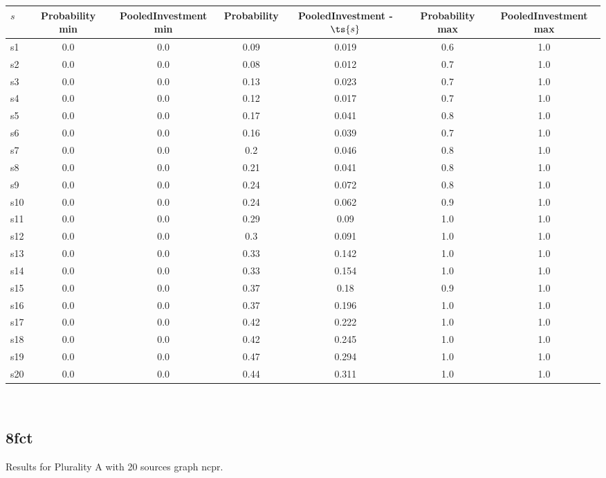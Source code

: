 \documentclass{article}
\begin{document}
\noindent\begin{tabular}{|l|c|c|c|c|c|c|}
\hline
$s$& Probability min & PooledInvestment min & Probability & PooledInvestment - $\ts{s}$ & Probability max & PooledInvestment max\\
\hline
s1 &0.0 & 0.0 & 0.09 & 0.019 & 0.6 & 1.0\\
\hline
s2 &0.0 & 0.0 & 0.08 & 0.012 & 0.7 & 1.0\\
\hline
s3 &0.0 & 0.0 & 0.13 & 0.023 & 0.7 & 1.0\\
\hline
s4 &0.0 & 0.0 & 0.12 & 0.017 & 0.7 & 1.0\\
\hline
s5 &0.0 & 0.0 & 0.17 & 0.041 & 0.8 & 1.0\\
\hline
s6 &0.0 & 0.0 & 0.16 & 0.039 & 0.7 & 1.0\\
\hline
s7 &0.0 & 0.0 & 0.2 & 0.046 & 0.8 & 1.0\\
\hline
s8 &0.0 & 0.0 & 0.21 & 0.041 & 0.8 & 1.0\\
\hline
s9 &0.0 & 0.0 & 0.24 & 0.072 & 0.8 & 1.0\\
\hline
s10 &0.0 & 0.0 & 0.24 & 0.062 & 0.9 & 1.0\\
\hline
s11 &0.0 & 0.0 & 0.29 & 0.09 & 1.0 & 1.0\\
\hline
s12 &0.0 & 0.0 & 0.3 & 0.091 & 1.0 & 1.0\\
\hline
s13 &0.0 & 0.0 & 0.33 & 0.142 & 1.0 & 1.0\\
\hline
s14 &0.0 & 0.0 & 0.33 & 0.154 & 1.0 & 1.0\\
\hline
s15 &0.0 & 0.0 & 0.37 & 0.18 & 0.9 & 1.0\\
\hline
s16 &0.0 & 0.0 & 0.37 & 0.196 & 1.0 & 1.0\\
\hline
s17 &0.0 & 0.0 & 0.42 & 0.222 & 1.0 & 1.0\\
\hline
s18 &0.0 & 0.0 & 0.42 & 0.245 & 1.0 & 1.0\\
\hline
s19 &0.0 & 0.0 & 0.47 & 0.294 & 1.0 & 1.0\\
\hline
s20 &0.0 & 0.0 & 0.44 & 0.311 & 1.0 & 1.0\\
\hline
\end{tabular}\\

\newpage

\subsection{8fct}

\noindent Results for Plurality A with 20 sources graph ncpr.
\end{document}
